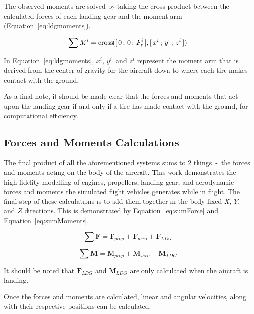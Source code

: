 \documentclass[12pt]{report}
\begin{document}
The observed moments are solved by taking the cross product between the calculated forces of each landing gear and the moment arm (Equation~\ref{eq:ldgmoments}).

\begin{equation}
  \sum M^i = \textnormal{cross}([\,0\,;\,0\,;\,F^i_z\,],[\,x^i\,;\,y^i\,;\,z^i\,])
  \label{eq:ldgmoments}
\end{equation}

In Equation~\ref{eq:ldgmoments}, \(x^i\), \(y^i\), and \(z^i\) represent the moment arm that is derived from the center of gravity for the aircraft down to where each tire makes contact with the ground.

As a final note, it should be made clear that the forces and moments that act upon the landing gear if and only if a tire has made contact with the ground, for computational efficiency.

\clearpage
\subsection{Forces and Moments Calculations}
The final product of all the aforementioned systems sums to 2 things~-~the forces and moments acting on the body of the aircraft. This work demonstrates the high-fidelity modelling of engines, propellers, landing gear, and aerodynamic forces and moments the simulated flight vehicles generates while in flight. The final step of these calculations is to add them together in the body-fixed \(X\), \(Y\), and \(Z\) directions. This is demonstrated by Equation~\ref{eq:sumForce} and Equation~\ref{eq:sumMoments}.

\begin{equation}
  \sum \mathbf{F} = \mathbf{F}_{prop} + \mathbf{F}_{aero} + \mathbf{F}_{LDG}
  \label{eq:sumForce}
\end{equation}

\begin{equation}
  \sum \mathbf{M} = \mathbf{M}_{prop} + \mathbf{M}_{aero} + \mathbf{M}_{LDG}
  \label{eq:sumMoments}
\end{equation}

It should be noted that \(\mathbf{F}_{LDG}\) and \(\mathbf{M}_{LDG}\) are only calculated when the aircraft is landing.

Once the forces and moments are calculated, linear and angular velocities, along with their respective positions can be calculated.
\clearpage
\end{document}
